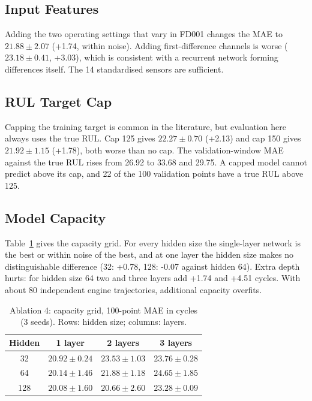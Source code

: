 \subsection{Input Features}
Adding the two operating settings that vary in FD001 changes the MAE to $21.88\pm2.07$ (+1.74, within noise).  Adding first-difference channels is worse ($23.18\pm0.41$, +3.03), which is consistent with a recurrent network forming differences itself.  The 14 standardised sensors are sufficient.

\subsection{RUL Target Cap}
Capping the training target is common in the literature, but evaluation here always uses the true RUL.  Cap 125 gives $22.27\pm0.70$ (+2.13) and cap 150 gives $21.92\pm1.15$ (+1.78), both worse than no cap.  The validation-window MAE against the true RUL rises from 26.92 to 33.68 and 29.75.  A capped model cannot predict above its cap, and 22 of the 100 validation points have a true RUL above 125.

\subsection{Model Capacity}
Table~\ref{tab:ablation_capacity} gives the capacity grid.  For every hidden size the single-layer network is the best or within noise of the best, and at one layer the hidden size makes no distinguishable difference (32: +0.78, 128: -0.07 against hidden 64).  Extra depth hurts: for hidden size 64 two and three layers add +1.74 and +4.51 cycles.  With about 80 independent engine trajectories, additional capacity overfits.

\begin{table}[t]
\centering
\caption{Ablation 4: capacity grid, 100-point MAE in cycles (3 seeds). Rows: hidden size; columns: layers.}
\label{tab:ablation_capacity}
\footnotesize
\begin{tabular}{cccc}
\toprule
Hidden & 1 layer & 2 layers & 3 layers \\
\midrule
32 & $20.92\pm0.24$ & $23.53\pm1.03$ & $23.76\pm0.28$ \\
64 & $20.14\pm1.46$ & $21.88\pm1.18$ & $24.65\pm1.85$ \\
128 & $20.08\pm1.60$ & $20.66\pm2.60$ & $23.28\pm0.09$ \\
\bottomrule
\end{tabular}
\end{table}

